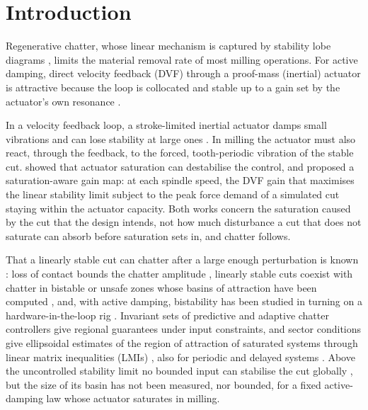 \section{Introduction}\label{sec:intro}

Regenerative chatter, whose linear mechanism is captured by stability lobe diagrams \citep{altintas1995analytical,insperger2002semi}, limits the material removal rate of most milling operations. For active damping, direct velocity feedback (DVF) through a proof-mass (inertial) actuator is attractive because the loop is collocated and stable up to a gain set by the actuator's own resonance \citep{elliott2001feedback}.

In a velocity feedback loop, a stroke-limited inertial actuator damps small vibrations and can lose stability at large ones \citep{baumann2007destabilization}. In milling the actuator must also react, through the feedback, to the forced, tooth-periodic vibration of the stable cut. \citet{ozsoy2025frequency} showed that actuator saturation can destabilise the control, and \citet{ozsoy2026robust} proposed a saturation-aware gain map: at each spindle speed, the DVF gain that maximises the linear stability limit subject to the peak force demand of a simulated cut staying within the actuator capacity. Both works concern the saturation caused by the cut that the design intends, not how much disturbance a cut that does not saturate can absorb before saturation sets in, and chatter follows.

That a linearly stable cut can chatter after a large enough perturbation is known \citep{kalmarnagy2001subcritical,stepan2005nonlinear}: loss of contact bounds the chatter amplitude \citep{tlusty1981basic}, linearly stable cuts coexist with chatter in bistable or unsafe zones \citep{dombovari2008estimates,dombovari2015bistable,dombovari2019experimental} whose basins of attraction have been computed \citep{yan2017basins}, and, with active damping, bistability has been studied in turning on a hardware-in-the-loop rig \citep{sahu2021bistability,sahu2023adaptive}. Invariant sets of predictive \citep{zhang2015ellipsoid} and adaptive \citep{wu2016adaptive} chatter controllers give regional guarantees under input constraints, and sector conditions give ellipsoidal estimates of the region of attraction of saturated systems through linear matrix inequalities (LMIs) \citep{hu2001book,gomesdasilva2005antiwindup,tarbouriech2011book}, also for periodic and delayed systems \citep{zhou2011periodic,li2017hinfinity,sakthivel2022jdsmc}. Above the uncontrolled stability limit no bounded input can stabilise the cut globally \citep{hu2001book}, but the size of its basin has not been measured, nor bounded, for a fixed active-damping law whose actuator saturates in milling.

